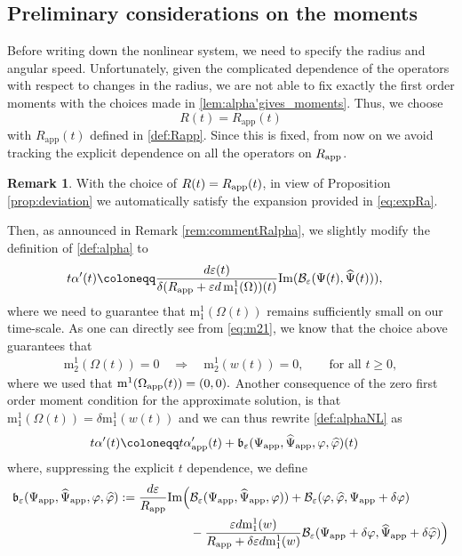 \documentclass[11pt,reqno,a4paper]{amsart}
\def\eps{\varepsilon}
\def\Im{{\rm Im}}
\newcommand{\cB}{\mathcal{B}}
\newcommand{\app}{\mathrm{app}}
\newcommand{\mrm}{\mathrm{m}}
\newcommand{\1}{\mathbbm{1}}
\theoremstyle{definition}
\newtheorem{remark}[proposition]{Remark}
\theoremstyle{definition}
\numberwithin{equation}{section}
\begin{document}
\subsection{Preliminary considerations on the moments}
Before writing down the nonlinear system, we need to specify the radius and angular speed. Unfortunately, 
given the complicated dependence of the operators with respect to changes in the radius, we are not able to fix exactly the first order moments with the choices made in \cref{lem:alpha'gives_moments}. Thus, we choose $$R(t)=R_{\app}(t)$$ with $R_{\app}(t)$ defined in \cref{def:Rapp}. Since this is fixed, from now on we avoid tracking the explicit dependence on all the operators on $R_{\rm app}$.
\begin{remark}
\label{rem:RRapp}
    With the choice of $R(t)=R_{\rm app}(t)$, in view of Proposition \ref{prop:deviation} we automatically satisfy the expansion provided in \cref{eq:expRa}.
\end{remark}
Then, as announced in Remark \ref{rem:commentRalpha}, we slightly modify the definition of \cref{def:alpha} to 
    \begin{align}
    \label{def:alphaNL}
t\alpha'(t)&\coloneqq\frac{d\eps(t)}{\delta (R_{\rm app}+\eps d\, \mrm_1^1(\Omega))(t)}\Im(\cB_{\eps}(\Psi(t),\widehat{\Psi}(t))),
    \end{align}
    where we need to guarantee that $\mrm_1^1(\Omega(t))$ remains sufficiently small on our time-scale. As one can directly see from \cref{eq:m21}, we know that the choice above guarantees that 
\begin{align}
    \mrm_2^{1}(\Omega(t))=0 \quad \Longrightarrow \quad \mrm_2^1(w(t))=0, \qquad \text{for all } t\geq0,
\end{align}
where we used that $\mrm^1(\Omega_{\rm app}(t))=(0,0).$ Another consequence of the zero first order moment condition for the approximate solution,  is that $\mrm^1_1(\Omega(t))=\delta \mrm^1_1(w(t))$ and we can thus rewrite \cref{def:alphaNL} as 
    \begin{align}
    \label{def:alphaNL1}
t\alpha'(t)&\coloneqq t\alpha_{\rm app}'(t)+\mathfrak{b}_{\eps}(\Psi_{\rm app},\widehat{\Psi}_{\rm app},\varphi,\widehat{\varphi})(t)
    \end{align}
    where, suppressing the explicit $t$ dependence, we define 
    \begin{align}
    \label{def:frakb}
        \mathfrak{b}_{\eps}(\Psi_{\rm app},\widehat{\Psi}_{\rm app},\varphi,\widehat{\varphi}):=\frac{d \eps}{R_{\rm app}}\Im\Big(&\cB_{\eps}(\Psi_{\rm app},\widehat{\Psi}_{\rm app},\varphi))+\cB_\eps(\varphi,\widehat{\varphi},\Psi_{\rm app}+ \delta \varphi)\\
        &-\frac{\eps d \mrm_1^1(w)}{R_{\rm app}+\delta\eps d \mrm_1^1(w)}\cB_{\eps}(\Psi_{\rm app}+\delta \varphi,\widehat{\Psi}_{\rm app}+\delta \widehat{\varphi})\Big)
    \end{align}
\end{document}
